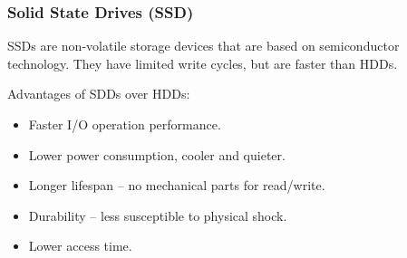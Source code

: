 \subsubsection{Solid State Drives (SSD)}

SSDs are non-volatile storage devices that are based on semiconductor technology. They
have limited write cycles, but are faster than HDDs.

Advantages of SDDs over HDDs:
\begin{itemize}
    \item Faster I/O operation performance.
    \item Lower power consumption, cooler and quieter.
    \item Longer lifespan -- no mechanical parts for read/write.
    \item Durability -- less susceptible to physical shock.
    \item Lower access time.
\end{itemize}